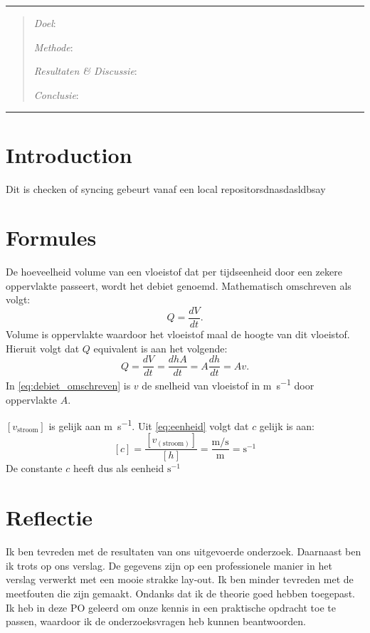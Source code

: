 \documentclass[numbers=endperiod]{scrartcl}
\begin{document}

\hrule
\begin{abstract}
    \textit{Doel}:

    \textit{Methode}:

    \textit{Resultaten \& Discussie}:

    \textit{Conclusie}:
\end{abstract}
\hrule
\newpage
\section{Introduction}
Dit is checken of syncing gebeurt vanaf een local repositorsdnasdasldbsay

\section{Formules}

De hoeveelheid volume van een vloeistof dat per tijdseenheid door een zekere oppervlakte passeert, wordt het debiet genoemd. Mathematisch omschreven als volgt:
\begin{equation}\label{eq:debiet}
    Q = \frac{dV}{dt}.
\end{equation}
Volume is oppervlakte waardoor het vloeistof maal de hoogte van dit vloeistof. Hieruit volgt dat $Q$ equivalent is aan het volgende:
\begin{equation}\label{eq:debiet_omschreven}
    Q = \frac{dV}{dt} = \frac{dhA}{dt} = A\frac{dh}{dt} = Av.
\end{equation}
In \cref{eq:debiet_omschreven} is $v$ de snelheid van vloeistof in \si{\meter\per\second} door oppervlakte $A$.

$[v_{\text{stroom}}]$ is gelijk aan \si{\meter\per\second}. Uit \cref{eq:eenheid} volgt dat $c$ gelijk is aan:
\begin{equation}\label{eq:eenheid}
[c] = \frac{[v_{(\text{stroom})}]}{[h]} = \frac{\si{\meter\per\second}}{\si{\meter}} = \si{\second}^{-1}
\end{equation}
De constante $c$ heeft dus als eenheid $\si{\second}^{-1}$


\newpage
\section{Reflectie}
Ik ben tevreden met de resultaten van ons uitgevoerde onderzoek. Daarnaast
ben ik trots op ons verslag. De gegevens zijn op een professionele
manier in het verslag verwerkt met een mooie strakke lay-out. Ik ben minder
tevreden met de meetfouten die zijn gemaakt. Ondanks dat ik de theorie
goed hebben toegepast. Ik heb in deze PO geleerd om onze kennis in
een praktische opdracht toe te passen, waardoor ik de onderzoeksvragen
heb kunnen beantwoorden.
\end{document}
